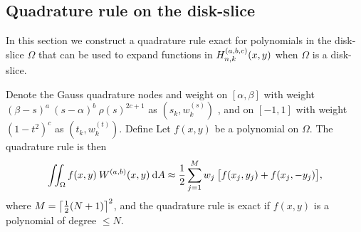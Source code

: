 \subsection{Quadrature rule on the disk-slice}

In this section we construct a quadrature rule exact for polynomials in the disk-slice $\Omega$ that can be used to expand functions in $H_{n,k}^{(a,b,c)}(x,y)$ when $\Omega$ is a disk-slice.

\begin{theorem}
Denote the  Gauss quadrature nodes and weight on $[\alpha,\beta]$ with weight $(\beta - s)^a \: (s - \alpha)^b \: \rho(s)^{2c+1}$ as $(s_k,w_k^{(s)})$ , and
 on \([-1,1]\) with weight \((1-t^2)^c\) as $(t_k,w_k^{(t)})$. Define
Let $f(x,y)$ be a polynomial on $\Omega$. The quadrature rule is then
$$
\iint_\Omega f(x,y) \: {W^{(a,b)}}(x,y) \: {\rm d} A \approx \frac{1}{2} \sum_{j=1}^{M} w_j \: \big[ f(x_j, y_j) + f(x_j, -y_j) \big],
$$
where $M = \left\lceil\frac{1}{2}(N+1)\right\rceil^2$, and the quadrature rule is exact if $f(x,y)$ is a polynomial of degree $\le N$.
\end{theorem}


